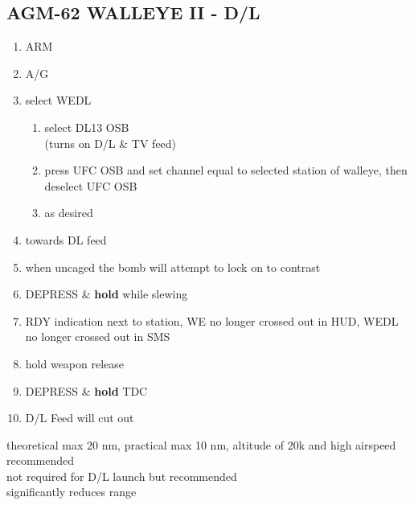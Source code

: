 \documentclass[fontHelvetica, widesubsec]{TechCheck}
\begin{document}
	\subsection{AGM-62 WALLEYE II - D/L}
	\begin{enumerate}
		\item {}\dotfill ARM
		\item {}\dotfill A/G
		\item {}\dotfill select WEDL
		\begin{enumerate}
			\item {}\dotfill select DL13 OSB\\
			\hfill  (turns on D/L \& TV feed)
			\item {}\dotfill press UFC OSB and set channel equal to selected station of walleye, then deselect UFC OSB
			\item {}\dotfill as desired
		\end{enumerate}
		\item {}\dotfill towards DL feed
		\item {}\dotfill when uncaged the bomb will attempt to lock on to contrast
		\item {}\dotfill DEPRESS \& \textbf{hold} while slewing
		\item {}\dotfill RDY indication next to station, WE no longer crossed out in HUD, WEDL no longer crossed out in SMS
		\item {}\dotfill hold weapon release
		\item {}\dotfill DEPRESS \& \textbf{hold} TDC
		\item {}\dotfill D/L Feed will cut out
	\end{enumerate}
	 theoretical max 20 nm, practical max 10 nm,
	altitude of 20k and high airspeed recommended \\
	 not required for D/L launch but recommended \\
	 significantly reduces range

	\thumbnar
\end{document}
